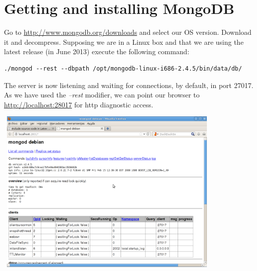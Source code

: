 \chapter{Getting and installing MongoDB}


Go to \url{http://www.mongodb.org/downloads} and select our OS version. Download it and decompress. Supposing we are in a Linux box and that we are using the latest release (in June 2013) execute the following command: \begin{verbatim}./mongod --rest --dbpath /opt/mongodb-linux-i686-2.4.5/bin/data/db/ \end{verbatim} The server is now listening and waiting for connections, by default, in port 27017. As we have used the \textit{--rest} modifier, we can point our browser to \url{http://localhost:28017} for http diagnostic access. \newline

\includegraphics[width=11cm,height=8cm]{images/mongo_webconsole.png}